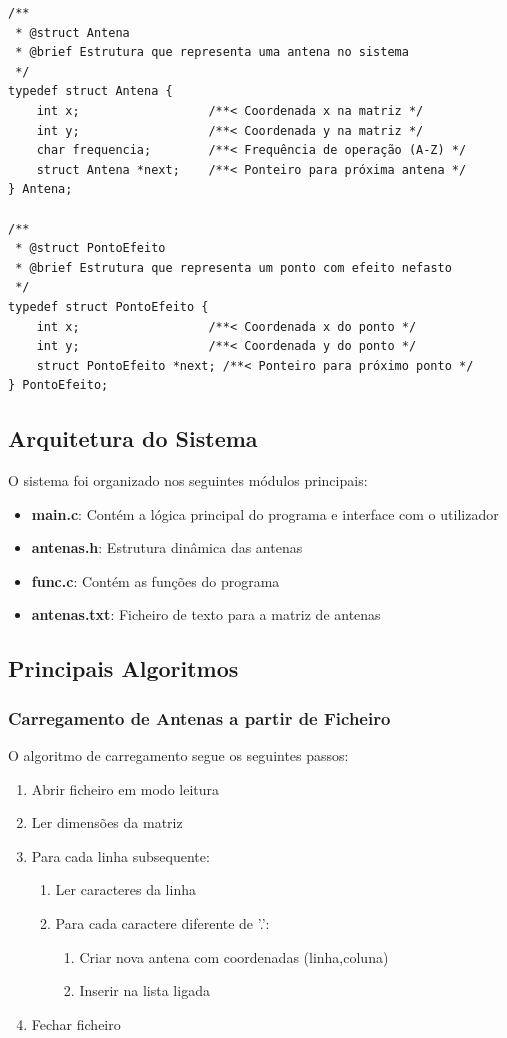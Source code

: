 \documentclass[a4paper,12pt]{article}
\begin{document}
\begin{verbatim}
/**
 * @struct Antena
 * @brief Estrutura que representa uma antena no sistema
 */
typedef struct Antena {
    int x;                  /**< Coordenada x na matriz */
    int y;                  /**< Coordenada y na matriz */
    char frequencia;        /**< Frequência de operação (A-Z) */
    struct Antena *next;    /**< Ponteiro para próxima antena */
} Antena;

/**
 * @struct PontoEfeito
 * @brief Estrutura que representa um ponto com efeito nefasto
 */
typedef struct PontoEfeito {
    int x;                  /**< Coordenada x do ponto */
    int y;                  /**< Coordenada y do ponto */
    struct PontoEfeito *next; /**< Ponteiro para próximo ponto */
} PontoEfeito;
\end{verbatim}

\subsection{Arquitetura do Sistema}
O sistema foi organizado nos seguintes módulos principais:

\begin{itemize}
    \item \textbf{main.c}: Contém a lógica principal do programa e interface com o utilizador
    \item \textbf{antenas.h}: Estrutura dinâmica das antenas
    \item \textbf{func.c}: Contém as funções do programa
    \item \textbf{antenas.txt}: Ficheiro de texto para a matriz de antenas
\end{itemize}

\subsection{Principais Algoritmos}
\subsubsection{Carregamento de Antenas a partir de Ficheiro}
O algoritmo de carregamento segue os seguintes passos:
\begin{enumerate}
    \item Abrir ficheiro em modo leitura
    \item Ler dimensões da matriz
    \item Para cada linha subsequente:
    \begin{enumerate}
        \item Ler caracteres da linha
        \item Para cada caractere diferente de '.':
        \begin{enumerate}
            \item Criar nova antena com coordenadas (linha,coluna)
            \item Inserir na lista ligada
        \end{enumerate}
    \end{enumerate}
    \item Fechar ficheiro
\end{enumerate}
\end{document}
